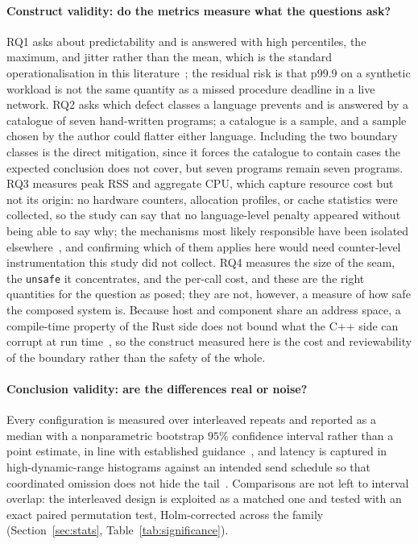 \documentclass[english,twoside,openright,a4paper,censored,csm,software-track-2020]{HYthesisML}
\begin{document}
\paragraph{Construct validity: do the metrics measure what the questions ask?}
RQ1 asks about predictability and is answered with high percentiles, the maximum, and jitter
rather than the mean, which is the standard operationalisation in this
literature~\cite{dean2013tail}; the residual risk is that p99.9 on a synthetic workload is not
the same quantity as a missed procedure deadline in a live network. RQ2 asks which defect
classes a language prevents and is answered by a catalogue of seven hand-written programs; a
catalogue is a sample, and a sample chosen by the author could flatter either language.
Including the two boundary classes is the direct mitigation, since it forces the catalogue to
contain cases the expected conclusion does not cover, but seven programs remain seven
programs. RQ3 measures peak RSS and aggregate CPU, which capture resource cost but not its
origin: no hardware counters, allocation profiles, or cache statistics were collected, so the
study can say that no language-level penalty appeared without being able to say why; the
mechanisms most likely responsible have been isolated
elsewhere~\cite{zhang2022runtime,harris2023morello}, and confirming which of them applies here
would need counter-level instrumentation this study did not collect. RQ4 measures the size of
the seam, the \texttt{unsafe} it concentrates, and the per-call cost, and these are the right
quantities for the question as posed; they are not, however, a measure of how safe the
composed system is. Because host and component share an address space, a compile-time property
of the Rust side does not bound what the C++ side can corrupt at run
time~\cite{rivera2021galeed,kirth2022pkrusafe}, so the construct measured here is the cost and
reviewability of the boundary rather than the safety of the whole.

\paragraph{Conclusion validity: are the differences real or noise?}
Every configuration is measured over \NRepeats{} interleaved repeats and reported as a median
with a nonparametric bootstrap $95\%$ confidence interval rather than a point estimate, in
line with established guidance~\cite{georges2007rigorous}, and latency is captured in
high-dynamic-range histograms against an intended send schedule so that coordinated omission
does not hide the tail~\cite{tene_hdrhistogram}. Comparisons are not left to interval overlap:
the interleaved design is exploited as a matched one and tested with an exact paired
permutation test, Holm-corrected across the family
(Section~\ref{sec:stats}, Table~\ref{tab:significance}).
\end{document}
